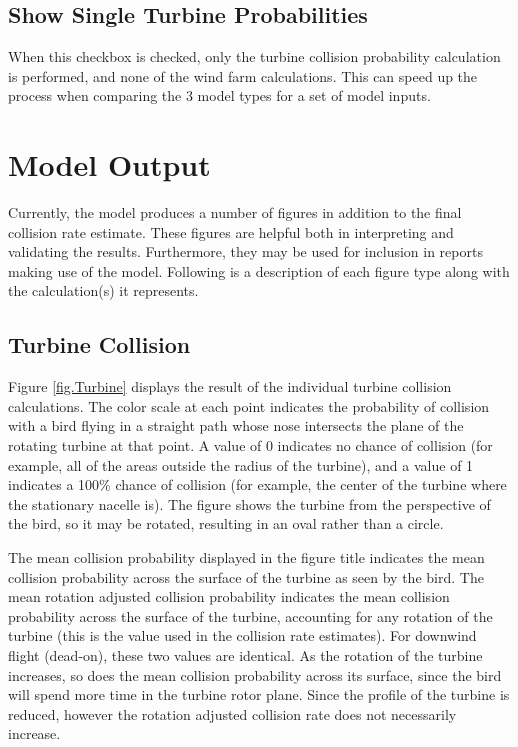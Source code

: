 \documentclass[11pt,letterpaper,openany]{report}
\begin{document}
\section{Show Single Turbine Probabilities}
When this checkbox is checked, only the turbine collision probability calculation is performed, and none of the wind
farm calculations. This can speed up the process when comparing the 3 model types for a set of model inputs.

\chapter{Model Output}
Currently, the model produces a number of figures in addition to the final collision rate estimate. These figures are
helpful both in interpreting and validating the results. Furthermore, they may be used for inclusion in reports making
use of the model. Following is a description of each figure type along with the calculation(s) it represents.

\section{Turbine Collision}
Figure \ref{fig.Turbine} displays the result of the individual turbine collision calculations. The color scale at each
point indicates the probability of collision with a bird flying in a straight path whose nose intersects the plane of
the rotating turbine at that point. A value of 0 indicates no chance of collision (for example, all of the areas
outside the radius of the turbine), and a value of 1 indicates a 100\% chance of collision (for example, the center of
the turbine where the stationary nacelle is). The figure shows the turbine from the perspective of the bird, so it may
be rotated, resulting in an oval rather than a circle.

The mean collision probability displayed in the figure title indicates the mean collision probability across the
surface of the turbine as seen by the bird. The mean rotation adjusted collision probability indicates the mean
collision probability across the surface of the turbine, accounting for any rotation of the turbine (this is the value
used in the collision rate estimates). For downwind flight (dead-on), these two values are identical. As the rotation
of the turbine increases, so does the mean collision probability across its surface, since the bird will spend more
time in the turbine rotor plane. Since the profile of the turbine is reduced, however the rotation adjusted collision
rate does not necessarily increase.
\end{document}
